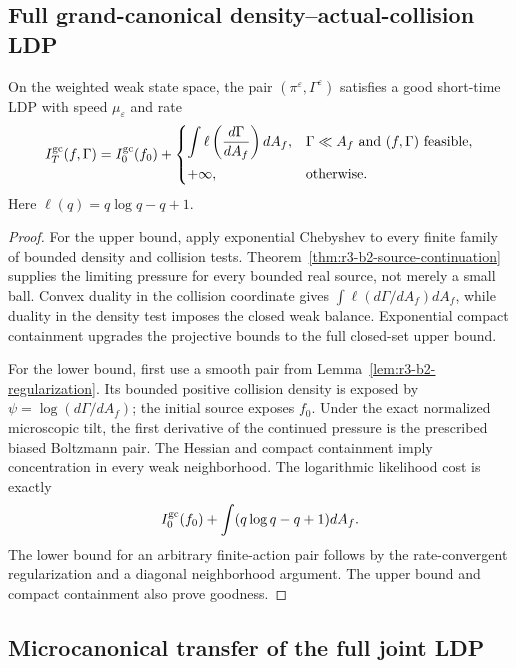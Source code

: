 \subsection{Full grand-canonical density--actual-collision LDP}

\begin{theorem}
\label{thm:r3-b2-gc-ldp}
On the weighted weak state space, the pair
\((\pi^\varepsilon,\Gamma^\varepsilon)\) satisfies a good short-time LDP with
speed \(\mu_\varepsilon\) and rate
\[
 I_T^{\rm gc}(f,\Gamma)
 =I_0^{\rm gc}(f_0)
 +\begin{cases}
 \displaystyle\int
 \ell\left(\frac{d\Gamma}{dA_f}\right)dA_f,
 &\Gamma\ll A_f\text{ and }(f,\Gamma)\text{ feasible},\\[2ex]
 +\infty,&\text{otherwise}.
 \end{cases}
\]
Here \(\ell(q)=q\log q-q+1\).
\end{theorem}

\begin{proof}
For the upper bound, apply exponential Chebyshev to every finite family of
bounded density and collision tests.  Theorem~\ref{thm:r3-b2-source-continuation}
supplies the limiting pressure for every bounded real source, not merely a
small ball.  Convex duality in the collision coordinate gives
\(\int\ell(d\Gamma/dA_f)dA_f\), while duality in the density test imposes the
closed weak balance.  Exponential compact containment upgrades the projective
bounds to the full closed-set upper bound.

For the lower bound, first use a smooth pair from
Lemma~\ref{lem:r3-b2-regularization}.  Its bounded positive collision density
is exposed by \(\psi=\log(d\Gamma/dA_f)\); the initial source exposes
\(f_0\).  Under the exact normalized microscopic tilt, the first derivative of
the continued pressure is the prescribed biased Boltzmann pair.  The Hessian
and compact containment imply concentration in every weak neighborhood.  The
logarithmic likelihood cost is exactly
\[
 I_0^{\rm gc}(f_0)+
 \int(q\log q-q+1)dA_f.
\]
The lower bound for an arbitrary finite-action pair follows by the
rate-convergent regularization and a diagonal neighborhood argument.  The
upper bound and compact containment also prove goodness.
\end{proof}

\subsection{Microcanonical transfer of the full joint LDP}

